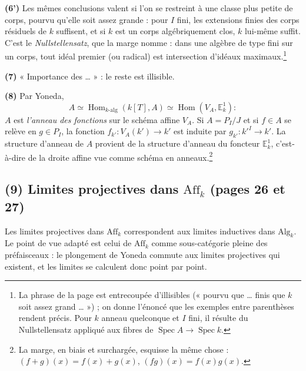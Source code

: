 \documentclass[11pt,a4paper]{article}
\begin{document}
\textbf{(6')} Les mêmes conclusions valent si l'on se restreint à une classe
plus petite de corps, pourvu qu'elle soit assez grande : pour $I$ fini, les
extensions finies des corps résiduels de $k$ suffisent, et si $k$ est un corps
algébriquement clos, $k$ lui-même suffit. C'est le
\emph{Nullstellensatz}, que la marge nomme : dans une algèbre de type fini sur
un corps, tout idéal premier (ou radical) est intersection d'idéaux
maximaux.\footnote{La phrase de la page est entrecoupée d'illisibles (« pourvu
que … finis que $k$ soit assez grand … ») ; on donne l'énoncé que les
exemples entre parenthèses rendent précis. Pour $k$ anneau quelconque et $I$
fini, il résulte du Nullstellensatz appliqué aux fibres de
$\operatorname{Spec} A \to \operatorname{Spec} k$.}

\textbf{(7)} « Importance des … » : le reste est illisible.

\textbf{(8)} Par Yoneda,
\[
A \simeq \operatorname{Hom}_{k\text{-alg}}(k[T], A) \simeq \operatorname{Hom}(V_A, \mathbb{E}^1_k) :
\]
$A$ est \emph{l'anneau des fonctions} sur le schéma affine $V_A$. Si
$A = P_I / J$ et si $f \in A$ se relève en $g \in P_I$, la fonction
$f_{k'} : V_A(k') \to k'$ est induite par $g_{k'} : k'^I \to k'$. La structure
d'anneau de $A$ provient de la structure d'anneau du foncteur
$\mathbb{E}^1_k$, c'est-à-dire de la droite affine vue comme schéma en
anneaux.\footnote{La marge, en biais et surchargée, esquisse la même chose :
$(f+g)(x) = f(x) + g(x)$, $(fg)(x) = f(x)g(x)$.}

\subsection*{(9) Limites projectives dans $\mathrm{Aff}_k$ (pages 26 et 27)}

Les limites projectives dans $\mathrm{Aff}_k$ correspondent aux limites
inductives dans $\mathrm{Alg}_k$. Le point de vue adapté est celui de
$\mathrm{Aff}_k$ comme sous-catégorie pleine des préfaisceaux : le plongement de
Yoneda commute aux limites projectives qui existent, et les limites se
calculent donc point par point.
\end{document}
